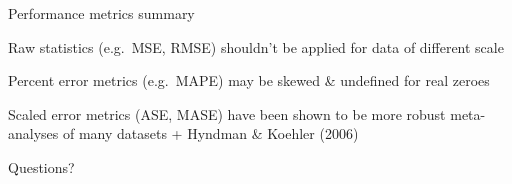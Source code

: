 \documentclass[ignorenonframetext,]{beamer}
\begin{document}
\begin{frame}{Performance metrics summary}
\protect\hypertarget{performance-metrics-summary}{}

Raw statistics (e.g.~MSE, RMSE) shouldn't be applied for data of
different scale

Percent error metrics (e.g.~MAPE) may be skewed \& undefined for real
zeroes

Scaled error metrics (ASE, MASE) have been shown to be more robust
meta-analyses of many datasets + Hyndman \& Koehler (2006)

\begin{block}{Questions?}

\end{block}

\end{frame}
\end{document}
